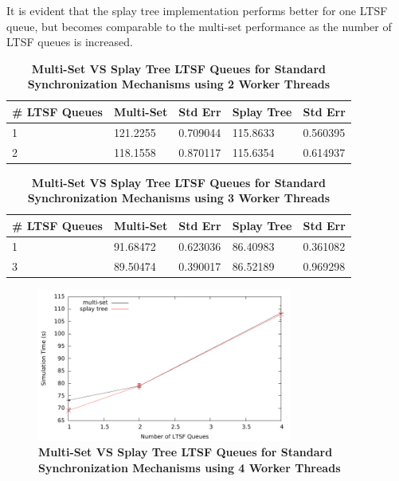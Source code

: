 \documentclass[11pt]{book}
\begin{document}
It is evident that the splay tree implementation performs better for one LTSF
queue, but becomes comparable to the multi-set performance as the number of LTSF
queues is increased.  

\begin{table}[H]
    \centering
    \begin{tabular}{l|p{2cm}|p{2cm}|p{2cm}|p{2cm}}
        \textbf{\# LTSF Queues}&Multi-Set &Std Err &Splay Tree &Std Err\\
        \hline
        \midrule
            1 &121.2255  &0.709044 &115.8633  &0.560395\\ 
            2 &118.1558  &0.870117 &115.6354  &0.614937\\
    \end{tabular}
    \caption{\textbf{Multi-Set VS Splay Tree LTSF Queues for Standard Synchronization
        Mechanisms using 2 Worker Threads}}\label{tab:noThrMig_2threadsXschq_msVSst_std}
\end{table}

\begin{table}[H]
\centering
\begin{tabular}{l|p{2cm}|p{2cm}|p{2cm}|p{2cm}}
    \textbf{\# LTSF Queues}&Multi-Set &Std Err &Splay Tree &Std Err\\
    \hline
    \midrule
        1 &91.68472  &0.623036 &86.40983  &0.361082\\ 
        3 &89.50474  &0.390017 &86.52189  & 0.969298\\
\end{tabular}
\caption{\textbf{Multi-Set VS Splay Tree LTSF Queues for Standard Synchronization
    Mechanisms using 3 Worker Threads}}\label{tab:noThrMig_3threadsXschq_msVSst_std}
\end{table}

\begin{figure}[H]
    \centering
    \graphicspath{ {./figures/} }
    \includegraphics[width=0.75\textwidth,keepaspectratio]{hugeepidemicsim-NOmig-timeVSschedQs-msVSst-4thread-std}
\caption{\textbf{Multi-Set VS Splay Tree LTSF Queues for Standard Synchronization
    Mechanisms using 4 Worker Threads}}\label{fig:noThrMig_timeVSschq_4threads_msVSst_std}
\end{figure}
\end{document}
